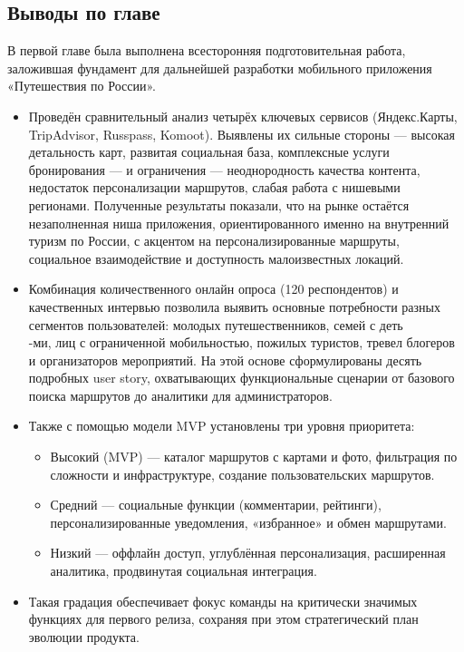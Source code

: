 \subsection*{Выводы по главе}
В первой главе была выполнена всесторонняя подготовительная работа, заложившая фундамент для дальнейшей разработки мобильного приложения «Путешествия по России».
\begin{itemize}
    \item Проведён сравнительный анализ четырёх ключевых сервисов (Яндекс.Карты, TripAdvisor, Russpass, Komoot). Выявлены их сильные стороны — высокая детальность карт, развитая социальная база, комплексные услуги бронирования — и ограничения — неоднородность качества контента, недостаток персонализации маршрутов, слабая работа с нишевыми регионами. Полученные результаты показали, что на рынке остаётся незаполненная ниша приложения, ориентированного именно на внутренний туризм по России, с акцентом на персонализированные маршруты, социальное взаимодействие и доступность малоизвестных локаций.
    \item Комбинация количественного онлайн опроса (120 респондентов) и качественных интервью позволила выявить основные потребности разных сегментов пользователей: молодых путешественников, семей с деть\\-ми, лиц с ограниченной мобильностью, пожилых туристов, тревел блогеров и организаторов мероприятий. На этой основе сформулированы десять подробных user story, охватывающих функциональные сценарии от базового поиска маршрутов до аналитики для администраторов.
    \item Также с помощью модели MVP установлены три уровня приоритета:
    \begin{itemize}
        \item Высокий (MVP) — каталог маршрутов с картами и фото, фильтрация по сложности и инфраструктуре, создание пользовательских маршрутов.
        \item Средний — социальные функции (комментарии, рейтинги), персонализированные уведомления, «избранное» и обмен маршрутами.
        \item Низкий — оффлайн доступ, углублённая персонализация, расширенная аналитика, продвинутая социальная интеграция.
    \end{itemize}
    \item Такая градация обеспечивает фокус команды на критически значимых функциях для первого релиза, сохраняя при этом стратегический план эволюции продукта.
\end{itemize}

